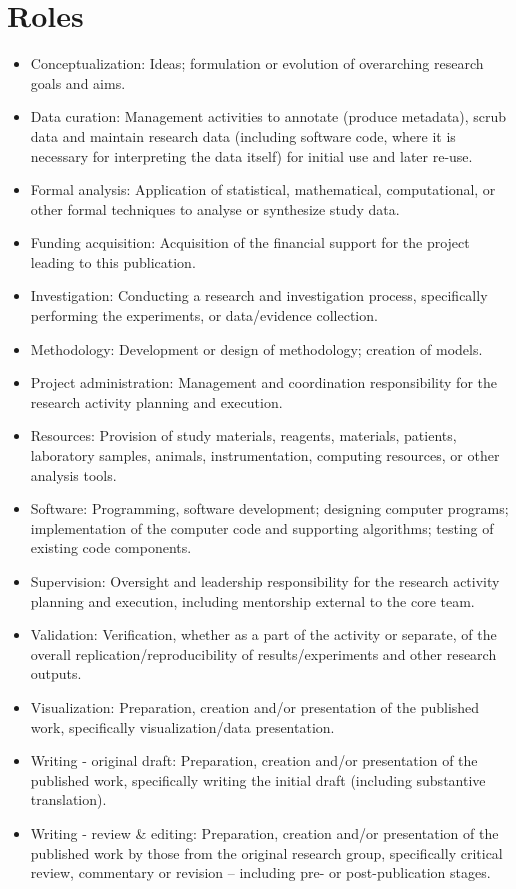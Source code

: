 \documentclass[
  oneside]{book}
\providecommand{\tightlist}{%
  \setlength{\itemsep}{0pt}\setlength{\parskip}{0pt}}
\begin{document}
\hypertarget{roles}{%
\section{Roles}\label{roles}}

\begin{itemize}
\tightlist
\item
  Conceptualization: Ideas; formulation or evolution of overarching research goals and aims.
\item
  Data curation: Management activities to annotate (produce metadata), scrub data and maintain research data (including software code, where it is necessary for interpreting the data itself) for initial use and later re-use.
\item
  Formal analysis: Application of statistical, mathematical, computational, or other formal techniques to analyse or synthesize study data.
\item
  Funding acquisition: Acquisition of the financial support for the project leading to this publication.
\item
  Investigation: Conducting a research and investigation process, specifically performing the experiments, or data/evidence collection.
\item
  Methodology: Development or design of methodology; creation of models.
\item
  Project administration: Management and coordination responsibility for the research activity planning and execution.
\item
  Resources: Provision of study materials, reagents, materials, patients, laboratory samples, animals, instrumentation, computing resources, or other analysis tools.
\item
  Software: Programming, software development; designing computer programs; implementation of the computer code and supporting algorithms; testing of existing code components.
\item
  Supervision: Oversight and leadership responsibility for the research activity planning and execution, including mentorship external to the core team.
\item
  Validation: Verification, whether as a part of the activity or separate, of the overall replication/reproducibility of results/experiments and other research outputs.
\item
  Visualization: Preparation, creation and/or presentation of the published work, specifically visualization/data presentation.
\item
  Writing - original draft: Preparation, creation and/or presentation of the published work, specifically writing the initial draft (including substantive translation).
\item
  Writing - review \& editing: Preparation, creation and/or presentation of the published work by those from the original research group, specifically critical review, commentary or revision -- including pre- or post-publication stages.
\end{itemize}
\end{document}
